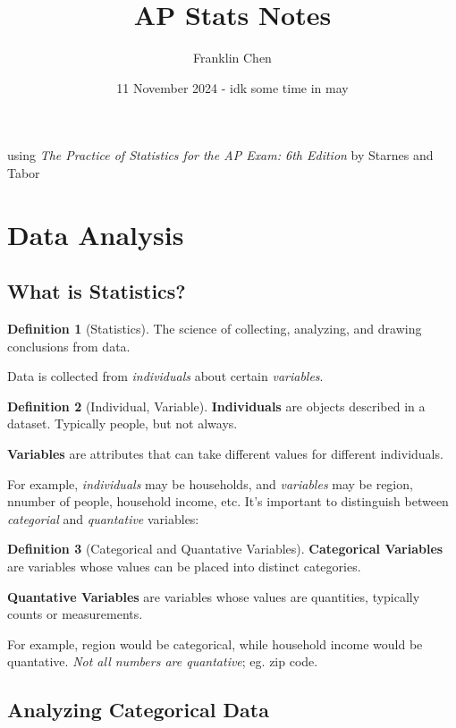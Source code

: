 \documentclass[12pt, a4paper]{article}
\title{AP Stats Notes}
\author{Franklin Chen}
\date{11 November 2024 - idk some time in may}
\theoremstyle{definition}
\newtheorem{definition}{Definition}
\begin{document}
\maketitle
\newpage

\tableofcontents
\newpage

using \textit{The Practice of Statistics for the AP Exam: 6th Edition} by Starnes and Tabor

\section{Data Analysis}
\subsection{What is Statistics?}

\begin{definition}[Statistics]
    The science of collecting, analyzing, and drawing conclusions from data.
\end{definition}

Data is collected from \emph{individuals} about certain \emph{variables}.

\begin{definition}[Individual, Variable]
    
    \textbf{Individuals} are objects described in a dataset. Typically people, but not always.
    
    \textbf{Variables} are attributes that can take different values for different individuals.
\end{definition}

For example, \emph{individuals} may be households, and \emph{variables} may be region, nnumber of people, household income, etc. It's important to distinguish between \emph{categorial} and \emph{quantative} variables:

\begin{definition}[Categorical and Quantative Variables]
    \textbf{Categorical Variables} are variables whose values can be placed into distinct categories.

    \textbf{Quantative Variables} are variables whose values are quantities, typically counts or measurements.
\end{definition}

For example, region would be categorical, while household income would be quantative. \emph{Not all numbers are quantative}; eg. zip code.

\subsection{Analyzing Categorical Data}
\end{document}
